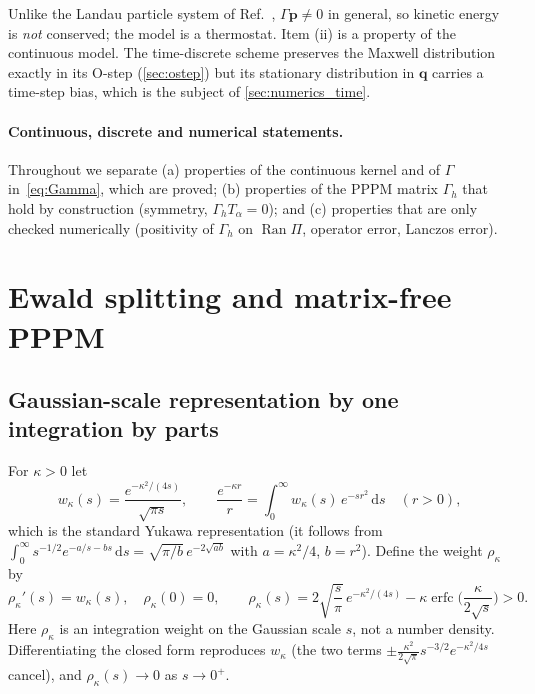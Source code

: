 \documentclass[11pt]{article}
\DeclareRobustCommand{\_}{\textunderscore\allowbreak}
\theoremstyle{remark}
\theoremstyle{definition}
\newcommand{\bq}{\mathbf{q}}
\newcommand{\bp}{\mathbf{p}}
\newcommand{\dd}{\,\mathrm{d}}
\newcommand{\Gh}{\Gamma_h}
\newcommand{\erfc}{\operatorname{erfc}}
\newcommand{\Ran}{\operatorname{Ran}}
\begin{document}
Unlike the Landau particle system of Ref.~\cite{ZhaoDouLei}, $\Gamma\bp\neq0$ in general, so kinetic energy is
\emph{not} conserved; the model is a thermostat. Item (ii) is a property of the continuous model. The time-discrete
scheme preserves the Maxwell distribution exactly in its O-step (\cref{sec:ostep}) but its stationary distribution
in $\bq$ carries a time-step bias, which is the subject of \cref{sec:numerics_time}.

\paragraph{Continuous, discrete and numerical statements.}
Throughout we separate (a) properties of the continuous kernel and of $\Gamma$ in~\eqref{eq:Gamma}, which are proved;
(b) properties of the PPPM matrix $\Gh$ that hold by construction (symmetry, $\Gh T_\alpha=0$); and (c) properties
that are only checked numerically (positivity of $\Gh$ on $\Ran\Pi$, operator error, Lanczos error).

\section{Ewald splitting and matrix-free PPPM}\label{sec:ewald}

\subsection{Gaussian-scale representation by one integration by parts}

For $\kappa>0$ let
\begin{equation}\label{eq:w}
w_\kappa(s)=\frac{e^{-\kappa^2/(4s)}}{\sqrt{\pi s}},\qquad
\frac{e^{-\kappa r}}{r}=\int_0^\infty w_\kappa(s)\,e^{-sr^2}\dd s\quad(r>0),
\end{equation}
which is the standard Yukawa representation (it follows from
$\int_0^\infty s^{-1/2}e^{-a/s-bs}\dd s=\sqrt{\pi/b}\,e^{-2\sqrt{ab}}$ with $a=\kappa^2/4$, $b=r^2$). Define the
weight $\rho_\kappa$ by
\begin{equation}\label{eq:rho}
\rho_\kappa'(s)=w_\kappa(s),\quad\rho_\kappa(0)=0,\qquad
\rho_\kappa(s)=2\sqrt{\frac{s}{\pi}}\,e^{-\kappa^2/(4s)}-\kappa\erfc\Big(\frac{\kappa}{2\sqrt s}\Big)>0 .
\end{equation}
Here $\rho_\kappa$ is an integration weight on the Gaussian scale $s$, not a number density. Differentiating the
closed form reproduces $w_\kappa$ (the two terms $\pm\frac{\kappa^2}{2\sqrt\pi}s^{-3/2}e^{-\kappa^2/4s}$ cancel), and
$\rho_\kappa(s)\to0$ as $s\to0^+$.
\end{document}
